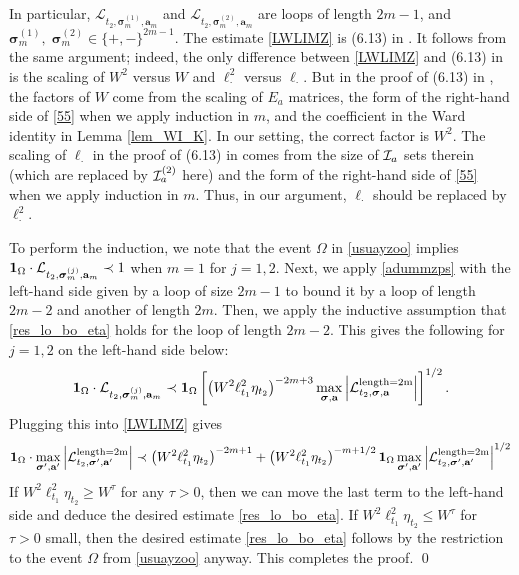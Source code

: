 In particular, $\mathcal{L}_{t_2, \boldsymbol{\sigma}_m^{(1)}, \textbf{a}_m}$ and $\mathcal{L}_{t_2, \boldsymbol{\sigma}_m^{(2)}, \textbf{a}_m}$ are  loops of length $2m-1$, and $\boldsymbol{\sigma}_m^{(1)}, \; \boldsymbol{\sigma}_m^{(2)}\in \{+,-\}^{2m-1}$. The estimate \eqref{LWLIMZ} is (6.13) in \cite{YY_25}. It follows from the same argument; indeed, the only difference between \eqref{LWLIMZ} and (6.13) in \cite{YY_25} is the scaling of $W^{2}$ versus $W$ and $\ell_{\cdot}^{2}$ versus $\ell_{\cdot}$. But in the proof of (6.13) in \cite{YY_25}, the factors of $W$ come from the scaling of $E_{a}$ matrices, the form of the right-hand side of \eqref{55} when we apply induction in $m$, and the coefficient in the Ward identity in Lemma \ref{lem_WI_K}. In our setting, the correct factor is $W^{2}$. The scaling of $\ell_{\cdot}$ in the proof of (6.13) in \cite{YY_25} comes from the size of ${\cal I}_{a}$ sets therein (which are replaced by ${\cal I}_{a}^{(2)}$ here) and the form of the right-hand side of \eqref{55} when we apply induction in $m$. Thus, in our argument, $\ell_{\cdot}$ should be replaced by $\ell_{\cdot}^{2}$.

To perform the induction, we note that the event $\Omega$ in \eqref{usuayzoo} implies ${\bf 1}_{\Omega}\cdot  \mathcal{L}_{t_2, \boldsymbol{\sigma}_m^{(j)}, \textbf{a}_m}\prec 1$ when $m=1$ for $j=1,2$. Next, we apply \eqref{adummzps} with the left-hand side given by a loop of size $2m-1$ to bound it by a loop of length $2m-2$ and another of length $2m$. Then, we apply the inductive assumption that \eqref{res_lo_bo_eta} holds for the loop of length $2m-2$. This gives the following for $j=1,2$ on the left-hand side below:
$$
   {\bf 1}_{\Omega}\cdot  \mathcal{L}_{t_2, \boldsymbol{\sigma}_m^{(j)}, \textbf{a}_m} \prec {\bf 1}_{\Omega}\left[ \left( W^{2} \ell_{t_1}^{2} \eta_{t_2} \right)^{-2m+3} \max_{\boldsymbol{\sigma} , \textbf{a} } \left| \mathcal{L}^{\text{length=2m}}_{t_2, \boldsymbol{\sigma} , \textbf{a} } \right| \right]^{1/2}.
    $$
Plugging this into \eqref{LWLIMZ} gives
$$
      {\bf 1}_{\Omega}\cdot\max_{\boldsymbol{\sigma}' , \textbf{a}' } \left| \mathcal{L}^{\text{length=2m}}_{t_2, \boldsymbol{\sigma}' , \textbf{a}' } \right|
    \prec \left( W^{2} \ell_{t_1}^{2} \eta_{t_2} \right)^{-2m+1 } 
    +\left( W^{2} \ell_{t_1}^{2} \eta_{t_2} \right)^{-m+1/2}{\bf 1}_{\Omega}
     \max_{\boldsymbol{\sigma}' , \textbf{a}' } \left| \mathcal{L}^{\text{length=2m}}_{t_2, \boldsymbol{\sigma}' , \textbf{a}' } \right|^{1/2}
$$
If $W^{2}\ell_{t_{1}}^{2}\eta_{t_{2}}\geq W^{\tau}$ for any $\tau>0$, then we can move the last term to the left-hand side and deduce the desired estimate \eqref{res_lo_bo_eta}. If $W^{2}\ell_{t_{1}}^{2}\eta_{t_{2}}\leq W^{\tau}$ for $\tau>0$ small, then the desired estimate \eqref{res_lo_bo_eta} follows by the restriction to the event $\Omega$ from \eqref{usuayzoo} anyway. This completes the proof. \qed




